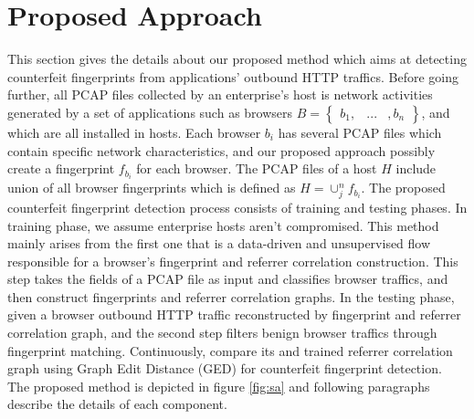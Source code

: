 \section{Proposed Approach}

This section gives the details about our proposed method which aims at detecting counterfeit fingerprints from applications' outbound HTTP traffics. Before going further, all PCAP files collected by an enterprise's host is network activities generated by a set of applications such as browsers $B = \begin{Bmatrix} b_{1}, & ... & , b_{n} \end{Bmatrix}$, and which are all installed in hosts. Each browser $b_{i}$ has several PCAP files which contain specific network characteristics, and our proposed approach possibly create a fingerprint $f_{b_{i}}$ for each browser. The PCAP files of a host $H$ include union of all browser fingerprints which is defined as $H = \cup^{n}_{j} f_{b_{i}}$. The proposed counterfeit fingerprint detection process consists of training and testing phases. In training phase, we assume enterprise hosts aren't compromised. This method mainly arises from the first one that is a data-driven and unsupervised flow responsible for a browser's fingerprint \cite{bortolameotti2017decanter} and referrer correlation construction. This step takes the fields of a PCAP file as input and classifies browser traffics, and then construct fingerprints and referrer correlation graphs. In the testing phase, given a browser outbound HTTP traffic reconstructed by fingerprint and referrer correlation graph, and the second step filters benign browser traffics through fingerprint matching. Continuously, compare its and trained referrer correlation graph using Graph Edit Distance (GED) for counterfeit fingerprint detection. The proposed method is depicted in figure \ref{fig:sa} and following paragraphs describe the details of each component.

